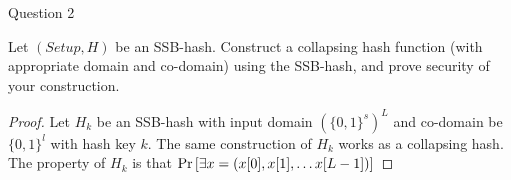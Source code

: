 \begin{solution}{Question 2}\label{ques:2}
    \begin{question}
    Let $(Setup, H)$ be an SSB-hash. Construct a collapsing hash function (with appropriate domain and co-domain) using the SSB-hash, and prove security of your construction.
    \end{question}
    \tcblower{}
    \begin{proof}
    Let $H_k$ be an SSB-hash with input domain $(\{0,1\}^s)^L$ and co-domain be $\{0,1\}^l$ with hash key $k$. The same construction of $H_k$ works as a collapsing hash. The property of $H_k$ is that $\Pr\left[ \exists x = (x[0], x[1], \ldots x[L-1]) \right]$
    \end{proof}
\end{solution}
 